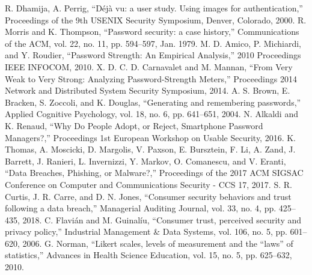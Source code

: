 \documentclass[letterpaper, 10 pt, conference]{ieeeconf}  %
\begin{document}
\begin{thebibliography}{99}

 R. Dhamija, A. Perrig, ``Déjà vu: a user study. Using images for authentication,'' Proceedings of the 9th USENIX Security Symposium, Denver, Colorado, 2000.
 R. Morris and K. Thompson, ``Password security: a case history,'' Communications of the ACM, vol. 22, no. 11, pp. 594–597, Jan. 1979.
 M. D. Amico, P. Michiardi, and Y. Roudier, ``Password Strength: An Empirical Analysis,'' 2010 Proceedings IEEE INFOCOM, 2010.
 X. D. C. D. Carnavalet and M. Mannan, ``From Very Weak to Very Strong: Analyzing Password-Strength Meters,'' Proceedings 2014 Network and Distributed System Security Symposium, 2014.
 A. S. Brown, E. Bracken, S. Zoccoli, and K. Douglas, ``Generating and remembering passwords,'' Applied Cognitive Psychology, vol. 18, no. 6, pp. 641–651, 2004.
 N. Alkaldi and K. Renaud, ``Why Do People Adopt, or Reject, Smartphone Password Managers?,'' Proceedings 1st European Workshop on Usable Security, 2016.
 K. Thomas, A. Moscicki, D. Margolis, V. Paxson, E. Bursztein, F. Li, A. Zand, J. Barrett, J. Ranieri, L. Invernizzi, Y. Markov, O. Comanescu, and V. Eranti, ``Data Breaches, Phishing, or Malware?,'' Proceedings of the 2017 ACM SIGSAC Conference on Computer and Communications Security - CCS 17, 2017.
 S. R. Curtis, J. R. Carre, and D. N. Jones, ``Consumer security behaviors and trust following a data breach,'' Managerial Auditing Journal, vol. 33, no. 4, pp. 425–435, 2018.
 C. Flavián and M. Guinalíu, ``Consumer trust, perceived security and privacy policy,'' Industrial Management \& Data Systems, vol. 106, no. 5, pp. 601–620, 2006.
 G. Norman, ``Likert scales, levels of measurement and the “laws” of statistics,'' Advances in Health Science Education, vol. 15, no. 5, pp. 625–632, 2010.


\end{thebibliography}
\end{document}

